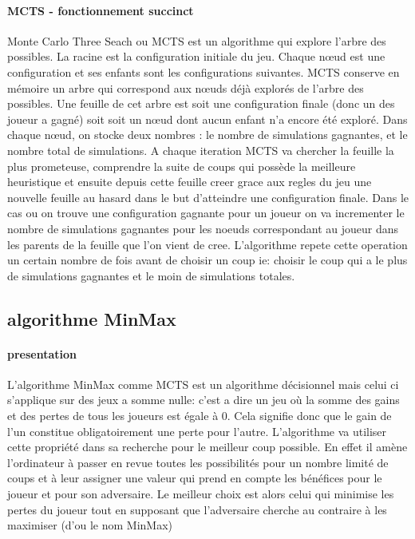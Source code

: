\paragraph {MCTS - fonctionnement succinct}
Monte Carlo Three Seach ou MCTS est un algorithme qui explore l'arbre des possibles. La racine est la configuration initiale du jeu.
Chaque nœud est une configuration et ses enfants sont les configurations suivantes. MCTS conserve en mémoire un arbre qui correspond 
aux nœuds déjà explorés de l'arbre des possibles. Une feuille de cet arbre est soit une configuration finale (donc un des joueur a gagné) soit
soit un nœud dont aucun enfant n'a encore été exploré. Dans chaque nœud, on stocke deux nombres : le nombre de simulations gagnantes, et le nombre total de simulations. 
A chaque iteration MCTS va chercher la feuille la plus prometeuse, comprendre la suite de coups qui possède la meilleure heuristique
et ensuite depuis cette feuille creer grace aux regles du jeu une nouvelle feuille au hasard dans le but d'atteindre une configuration finale.
Dans le cas ou on trouve une configuration gagnante pour un joueur on va incrementer le nombre de simulations gagnantes pour les noeuds
correspondant au joueur dans les parents de la feuille que l'on vient de cree.
L'algorithme repete cette operation un certain nombre de fois avant de choisir un coup ie: choisir le coup qui a le plus de simulations
gagnantes et le moin de simulations totales.



\subsection {algorithme MinMax}

\paragraph {presentation}
L'algorithme MinMax comme MCTS est un algorithme décisionnel mais celui ci s'applique sur des jeux a somme nulle: c'est a dire
un jeu où la somme des gains et des pertes de tous les joueurs est égale à 0. Cela signifie donc que le gain de l'un constitue 
obligatoirement une perte pour l'autre. L'algorithme va utiliser cette propriété dans sa recherche pour le meilleur coup possible.
En effet il amène l'ordinateur à passer en revue toutes les possibilités pour un nombre limité de coups et à leur assigner une valeur 
qui prend en compte les bénéfices pour le joueur et pour son adversaire. Le meilleur choix est alors celui qui minimise les pertes 
du joueur tout en supposant que l'adversaire cherche au contraire à les maximiser (d'ou le nom MinMax)

